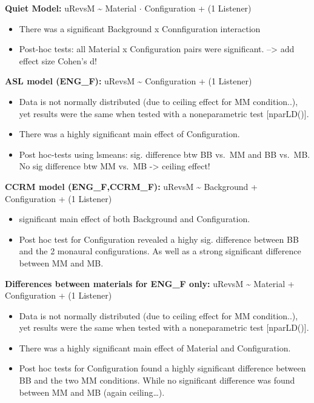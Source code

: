 \documentclass[a4paper, twoside]{templates/ociamthesis}
\begin{document}
\textbf{Quiet Model:} uRevsM \textasciitilde{} Material \(\cdot\) Configuration + (1 \textbar{} Listener)

\begin{itemize}
\item
  There was a significant Background x Connfiguration interaction
\item
  Post-hoc tests: all Material x Configuration pairs were significant. --\textgreater{} add effect size Cohen's d!
\end{itemize}

\textbf{ASL model (ENG\_F):} uRevsM \textasciitilde{} Configuration + (1 \textbar{} Listener)

\begin{itemize}
\item
  Data is not normally distributed (due to ceiling effect for MM condition..), yet results were the same when tested with a noneparametric test {[}nparLD(){]}.
\item
  There was a highly significant main effect of Configuration.
\item
  Post hoc-tests using lsmeans: sig. difference btw BB vs.~MM and BB vs.~MB. No sig difference btw MM vs.~MB -\textgreater{} ceiling effect!
\end{itemize}

\textbf{CCRM model (ENG\_F,CCRM\_F):} uRevsM \textasciitilde{} Background + Configuration + (1 \textbar{} Listener)

\begin{itemize}
\item
  significant main effect of both Background and Configuration.
\item
  Post hoc test for Configuration revealed a highy sig. difference between BB and the 2 monaural configurations. As well as a strong significant difference between MM and MB.
\end{itemize}

\textbf{Differences between materials for ENG\_F only:} uRevsM \textasciitilde{} Material + Configuration + (1 \textbar{} Listener)

\begin{itemize}
\item
  Data is not normally distributed (due to ceiling effect for MM condition..), yet results were the same when tested with a noneparametric test {[}nparLD(){]}.
\item
  There was a highly significant main effect of Material and Configuration.
\item
  Post hoc tests for Configuration found a highly significant difference between BB and the two MM conditions. While no significant difference was found between MM and MB (again ceiling\ldots).
\end{itemize}
\end{document}
